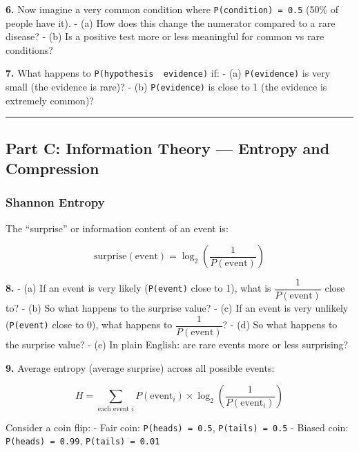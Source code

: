 \documentclass[
  11pt,
]{article}
\begin{document}
\textbf{6.} Now imagine a very common condition where
\texttt{P(condition)\ =\ 0.5} (50\% of people have it). - (a) How does
this change the numerator compared to a rare disease? - (b) Is a
positive test more or less meaningful for common vs rare conditions?

\textbf{7.} What happens to \texttt{P(hypothesis\ \textbar{}\ evidence)}
if: - (a) \texttt{P(evidence)} is very small (the evidence is rare)? -
(b) \texttt{P(evidence)} is close to 1 (the evidence is extremely
common)?

\begin{center}\rule{0.5\linewidth}{0.5pt}\end{center}

\hypertarget{part-c-information-theory-entropy-and-compression}{%
\subsection{Part C: Information Theory --- Entropy and
Compression}\label{part-c-information-theory-entropy-and-compression}}

\hypertarget{shannon-entropy}{%
\subsubsection{Shannon Entropy}\label{shannon-entropy}}

The ``surprise'' or information content of an event is:

\[\text{surprise}(\text{event}) = \log_2\left(\dfrac{1}{P(\text{event})}\right)\]

\textbf{8.} - (a) If an event is very likely (\texttt{P(event)} close to
1), what is \(\dfrac{1}{P(\text{event})}\) close to? - (b) So what
happens to the surprise value? - (c) If an event is very unlikely
(\texttt{P(event)} close to 0), what happens to
\(\dfrac{1}{P(\text{event})}\)? - (d) So what happens to the surprise
value? - (e) In plain English: are rare events more or less surprising?

\textbf{9.} Average entropy (average surprise) across all possible
events:

\[H = \sum_{\text{each event } i} P(\text{event}_i) \times \log_2\left(\dfrac{1}{P(\text{event}_i)}\right)\]

Consider a coin flip: - Fair coin: \texttt{P(heads)\ =\ 0.5},
\texttt{P(tails)\ =\ 0.5} - Biased coin: \texttt{P(heads)\ =\ 0.99},
\texttt{P(tails)\ =\ 0.01}
\end{document}
